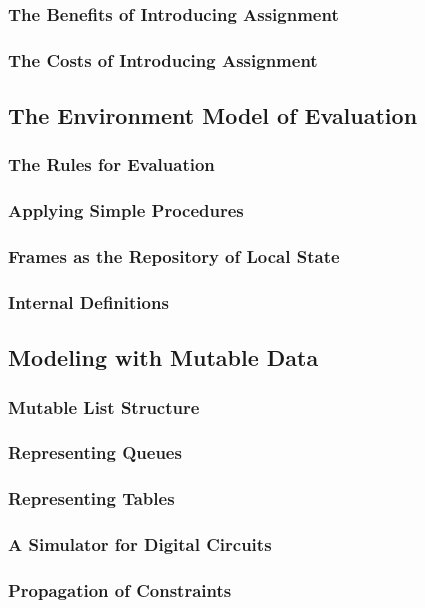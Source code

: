             \subsubsection{The Benefits of Introducing Assignment}
            \subsubsection{The Costs of Introducing Assignment}
        \subsection{The Environment Model of Evaluation}
            \subsubsection{The Rules for Evaluation}
            \subsubsection{Applying Simple Procedures}
            \subsubsection{Frames as the Repository of Local State}
            \subsubsection{Internal Definitions}
        \subsection{Modeling with Mutable Data}
            \subsubsection{Mutable List Structure}
            \subsubsection{Representing Queues}
            \subsubsection{Representing Tables}
            \subsubsection{A Simulator for Digital Circuits}
            \subsubsection{Propagation of Constraints}
